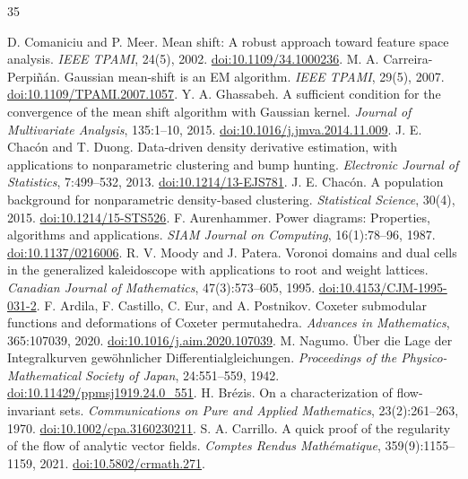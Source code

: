\documentclass[10pt]{article}
\begin{document}
\begin{thebibliography}{35}
\raggedright
{} D. Comaniciu and P. Meer. Mean shift: A robust approach toward feature space analysis. \emph{IEEE TPAMI}, 24(5), 2002. \href{https://doi.org/10.1109/34.1000236}{doi:10.1109/34.1000236}.
 M. A. Carreira-Perpi\~n\'an. Gaussian mean-shift is an EM algorithm. \emph{IEEE TPAMI}, 29(5), 2007. \href{https://doi.org/10.1109/TPAMI.2007.1057}{doi:10.1109/TPAMI.2007.1057}.
 Y. A. Ghassabeh. A sufficient condition for the convergence of the mean shift algorithm with Gaussian kernel. \emph{Journal of Multivariate Analysis}, 135:1--10, 2015. \href{https://doi.org/10.1016/j.jmva.2014.11.009}{doi:10.1016/j.jmva.2014.11.009}.
 J. E. Chac\'on and T. Duong. Data-driven density derivative estimation, with applications to nonparametric clustering and bump hunting. \emph{Electronic Journal of Statistics}, 7:499--532, 2013. \href{https://doi.org/10.1214/13-EJS781}{doi:10.1214/13-EJS781}.
 J. E. Chac\'on. A population background for nonparametric density-based clustering. \emph{Statistical Science}, 30(4), 2015. \href{https://doi.org/10.1214/15-STS526}{doi:10.1214/15-STS526}.
 F. Aurenhammer. Power diagrams: Properties, algorithms and applications. \emph{SIAM Journal on Computing}, 16(1):78--96, 1987. \href{https://doi.org/10.1137/0216006}{doi:10.1137/0216006}.
 R. V. Moody and J. Patera. Voronoi domains and dual cells in the generalized kaleidoscope with applications to root and weight lattices. \emph{Canadian Journal of Mathematics}, 47(3):573--605, 1995. \href{https://doi.org/10.4153/CJM-1995-031-2}{doi:10.4153/CJM-1995-031-2}.
 F. Ardila, F. Castillo, C. Eur, and A. Postnikov. Coxeter submodular functions and deformations of Coxeter permutahedra. \emph{Advances in Mathematics}, 365:107039, 2020. \href{https://doi.org/10.1016/j.aim.2020.107039}{doi:10.1016/j.aim.2020.107039}.
 M. Nagumo. \"Uber die Lage der Integralkurven gew\"ohnlicher Differentialgleichungen. \emph{Proceedings of the Physico-Mathematical Society of Japan}, 24:551--559, 1942. \href{https://doi.org/10.11429/ppmsj1919.24.0_551}{doi:10.11429/ppmsj1919.24.0\_551}.
 H. Brézis. On a characterization of flow-invariant sets. \emph{Communications on Pure and Applied Mathematics}, 23(2):261--263, 1970. \href{https://doi.org/10.1002/cpa.3160230211}{doi:10.1002/cpa.3160230211}.
 S. A. Carrillo. A quick proof of the regularity of the flow of analytic vector fields. \emph{Comptes Rendus Math\'ematique}, 359(9):1155--1159, 2021. \href{https://doi.org/10.5802/crmath.271}{doi:10.5802/crmath.271}.

\end{thebibliography}
\end{document}
